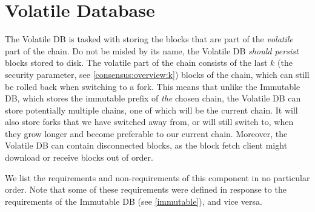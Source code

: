 \chapter{Volatile Database}
\label{volatile}

The Volatile DB is tasked with storing the blocks that are part of the
\emph{volatile} part of the chain. Do not be misled by its name, the Volatile DB
\emph{should persist} blocks stored to disk. The volatile part of the chain
consists of the last $k$ (the security parameter, see
\cref{consensus:overview:k}) blocks of the chain, which can still be rolled back
when switching to a fork. This means that unlike the Immutable DB, which stores
the immutable prefix of \emph{the} chosen chain, the Volatile DB can store
potentially multiple chains, one of which will be the current chain. It will
also store forks that we have switched away from, or will still switch to, when
they grow longer and become preferable to our current chain. Moreover, the
Volatile DB can contain disconnected blocks, as the block fetch
client might download or receive blocks out of order.

We list the requirements and non-requirements of this component in no particular
order. Note that some of these requirements were defined in response to the
requirements of the Immutable DB (see \cref{immutable}), and vice versa.

